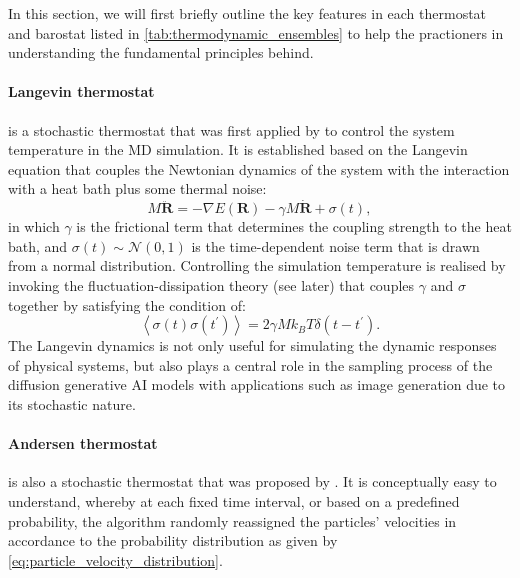 In this section, we will first briefly outline the key features in each thermostat and barostat listed in \cref{tab:thermodynamic_ensembles} to help the practioners in understanding the fundamental principles behind.

\paragraph{\textbf{Langevin thermostat}} is a stochastic thermostat that was first applied by \citet{schneider1978molecular} to control the system temperature in the MD simulation. It is established based on the Langevin equation that couples the Newtonian dynamics of the system with the interaction with a heat bath plus some thermal noise:
\begin{equation}
    \label{eq:Langevin_dynamic}
    M\ddot{\bm{R}}=-\nabla E(\bm{R})-\gamma M\dot{\bm{R}}+\sigma (t),
\end{equation}
in which $\gamma$ is the frictional term that determines the coupling strength to the heat bath, and $\sigma(t)\sim\mathcal{N}(0,1)$ is the time-dependent noise term that is drawn from a normal distribution. Controlling the simulation temperature is realised by invoking the fluctuation-dissipation theory\cite{kubo1966fluctuation} (see later) that couples $\gamma$ and $\sigma$ together by satisfying the condition of:
\begin{equation}\label{eq:langevin_fluctuation}
\left\langle\sigma(t)\sigma(t^\prime)\right\rangle=2\gamma M k_B T\delta(t-t^\prime).
\end{equation}
The Langevin dynamics is not only useful for simulating the dynamic responses of physical systems, but  also plays a central role in the sampling process of the diffusion generative AI models\cite{ho2020denoising} with applications such as image generation due to its stochastic nature.

\paragraph{\textbf{Andersen thermostat}} is also a stochastic thermostat that was proposed by \citet{andersen1980molecular}. It is conceptually easy to understand, whereby at each fixed time interval, or based on a predefined probability, the algorithm randomly reassigned the particles' velocities in accordance to the probability distribution as given by \cref{eq:particle_velocity_distribution}.

